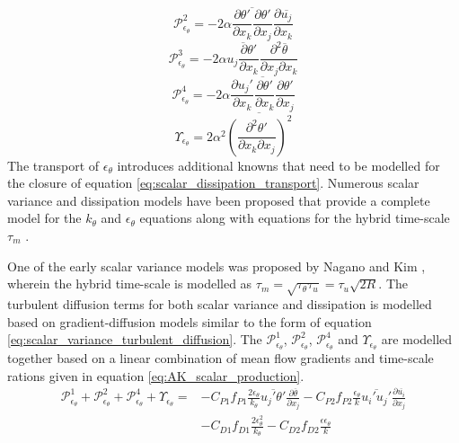 \begin{equation}
\label{eq:scalar_dissipation_production2}
\mathcal{P}_{\epsilon_{\theta}}^{2} = -2\alpha\overline{\frac{\partial \theta'}{\partial x_{k}}\frac{\partial \theta'}{\partial x_{j}}}\frac{\partial \overline{u_{j}}}{\partial x_{k}}
\end{equation}
\begin{equation}
\label{eq:scalar_dissipation_production3}
\mathcal{P}_{\epsilon_{\theta}}^{3} = -2\alpha\overline{u_{j}\frac{\partial \theta'}{\partial x_{k}}} \frac{\partial^{2} \overline{\theta}}{\partial x_{j} \partial x_{k}}
\end{equation}
\begin{equation}
\label{eq:scalar_dissipation_production4}
\mathcal{P}_{\epsilon_{\theta}}^{4} = -2\alpha\overline{\frac{\partial u_{j}'}{\partial x_{k}}\frac{\partial \theta'}{\partial x_{k}} \frac{\partial \theta'}{\partial x_{j}}}
\end{equation}
\begin{equation}
\label{eq:scalar_dissipation_destruction}
\Upsilon_{\epsilon_{\theta}} = 2\alpha^{2}\overline{\left(\frac{\partial^{2} \theta'}{\partial x_{k} \partial x_{j}}\right)^{2}}
\end{equation}
The transport of $\epsilon_{\theta}$ introduces additional knowns that need to be modelled for the closure of equation \ref{eq:scalar_dissipation_transport}. Numerous scalar variance and dissipation models have been proposed that provide a complete model for the $k_{\theta}$ and $\epsilon_{\theta}$ equations along with equations for the hybrid time-scale $\tau_{m}$ \cite{Yoder2016}. 

One of the early scalar variance models was proposed by Nagano and Kim \cite{Nagano1988}, wherein the hybrid time-scale is modelled as $\tau_{m} = \sqrt{\tau_{\theta}\tau_{u}} = \tau_{u}\sqrt{2R}$. The turbulent diffusion terms for both scalar variance and dissipation is modelled based on gradient-diffusion models similar to the form of equation \ref{eq:scalar_variance_turbulent_diffusion}. The $\mathcal{P}_{\epsilon_{\theta}}^{1}$, $\mathcal{P}_{\epsilon_{\theta}}^{2}$, $\mathcal{P}_{\epsilon_{\theta}}^{4}$ and $\Upsilon_{\epsilon_{\theta}}$ are modelled together based on a linear combination of mean flow gradients and time-scale rations given in equation \ref{eq:AK_scalar_production}. 
\begin{equation}
\label{eq:AK_scalar_production}
\begin{aligned}
\mathcal{P}_{\epsilon_{\theta}}^{1} + \mathcal{P}_{\epsilon_{\theta}}^{2} + \mathcal{P}_{\epsilon_{\theta}}^{4} + \Upsilon_{\epsilon_{\theta}} = {} & -C_{P1}f_{P1}\frac{2\epsilon_{\theta}}{k_{\theta}}\overline{u_{j}'\theta'}\frac{\partial \overline{\theta}}{\partial x_{j}} - C_{P2}f_{P2}\frac{\epsilon_{\theta}}{k}\overline{u_{i}'u_{j}'}\frac{\partial \overline{u_{i}}}{\partial x_{j}} \\
&- C_{D1}f_{D1}\frac{2\epsilon_{\theta}^{2}}{k_{\theta}} - C_{D2}f_{D2}\frac{\epsilon \epsilon_{\theta}}{k}
\end{aligned}
\end{equation}
